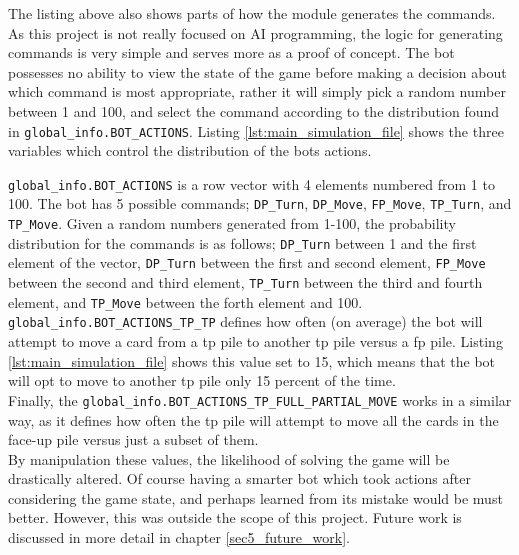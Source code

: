 \documentclass[runningheads,a4paper]{llncs}
\newcommand{\GPenSIM}{../GPenSIM}
\begin{document}

The listing above also shows parts of how the module generates the commands. As this project is not really focused on AI programming, the logic for generating commands is very simple and serves more as a proof of concept. The bot possesses no ability to view the state of the game before making a decision about which command is most appropriate, rather it will simply pick a random number between 1 and 100, and select the command according to the distribution found in \verb!global_info.BOT_ACTIONS!. Listing \ref{lst:main_simulation_file} shows the three variables which control the distribution of the bots actions. 


\verb!global_info.BOT_ACTIONS! is a row vector with 4 elements numbered from 1 to 100. The bot has 5 possible commands; \verb!DP_Turn!, \verb!DP_Move!, \verb!FP_Move!, \verb!TP_Turn!, and \verb!TP_Move!. Given a random numbers generated from 1-100, the probability distribution for the commands is as follows; \verb!DP_Turn! between 1 and the first element of the vector, \verb!DP_Turn! between the first and second element, \verb!FP_Move! between the second and third element, \verb!TP_Turn! between the third and fourth element, and \verb!TP_Move! between the forth element and 100.
\verb!global_info.BOT_ACTIONS_TP_TP! defines how often (on average) the bot will attempt to move a card from a \ac{tp} pile to another \ac{tp} pile versus a \ac{fp} pile. Listing \ref{lst:main_simulation_file} shows this value set to 15, which means that the bot will opt to move to another \ac{tp} pile only 15 percent of the time.\\
Finally, the \verb!global_info.BOT_ACTIONS_TP_FULL_PARTIAL_MOVE! works in a similar way, as it defines how often the \ac{tp} pile will attempt to move all the cards in the face-up pile versus just a subset of them.\\
By manipulation these values, the likelihood of solving the game will be drastically altered. Of course having a smarter bot which took actions after considering the game state, and perhaps learned from its mistake would be must better. However, this was outside the scope of this project. Future work is discussed in more detail in chapter \ref{sec5_future_work}.
\\
\end{document}
